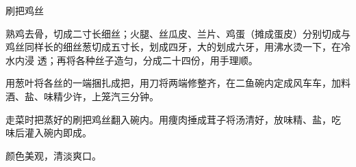 %
%
%
%
%
%
%
\begin{recipe}{刷把鸡丝}

\ingredients


\preparation

\step 熟鸡去骨，切成二寸长细丝；火腿、丝瓜皮、兰片、鸡蛋（摊成蛋皮）分别切成与
鸡丝同样长的细丝葱切成五寸长，划成四牙，大的划成六牙，用沸水烫一下，在冷水内浸
透；再将各种丝子造匀，分成二十四份，用手理顺。

\step 用葱叶将各丝的一端捆扎成把，用刀将两端修整齐，在二鱼碗内定成风车车，加料
酒、盐、味精少许，上笼汽三分钟。

\step 走菜时把蒸好的刷把鸡丝翻入碗内。用痩肉捶成茸子将汤清好，放味精、盐，吃
味后灌入碗内即成。

\features

颜色美观，清淡爽口。

\end{recipe}


